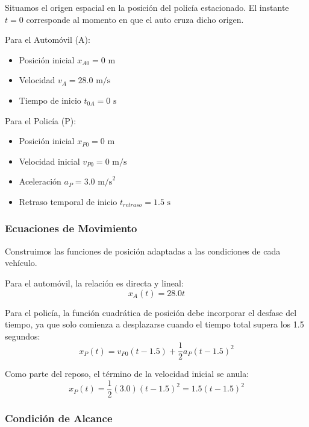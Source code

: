 \documentclass[12pt, a4paper]{article}
\begin{document}
Situamos el origen espacial en la posición del policía estacionado. El instante $t = 0$ corresponde al momento en que el auto cruza dicho origen.

Para el Automóvil (A):
\begin{itemize}
    \item Posición inicial $x_{A0} = 0 \text{ m}$
    \item Velocidad $v_A = 28.0 \text{ m/s}$
    \item Tiempo de inicio $t_{0A} = 0 \text{ s}$
\end{itemize}

Para el Policía (P):
\begin{itemize}
    \item Posición inicial $x_{P0} = 0 \text{ m}$
    \item Velocidad inicial $v_{P0} = 0 \text{ m/s}$
    \item Aceleración $a_P = 3.0 \text{ m/s}^2$
    \item Retraso temporal de inicio $t_{retraso} = 1.5 \text{ s}$
\end{itemize}

\subsubsection*{Ecuaciones de Movimiento}

Construimos las funciones de posición adaptadas a las condiciones de cada vehículo. 

Para el automóvil, la relación es directa y lineal:
\begin{equation}
x_A(t) = 28.0t
\end{equation}

Para el policía, la función cuadrática de posición debe incorporar el desfase del tiempo, ya que solo comienza a desplazarse cuando el tiempo total supera los 1.5 segundos:
\begin{equation}
x_P(t) = v_{P0}(t - 1.5) + \frac{1}{2} a_P (t - 1.5)^2
\end{equation}

Como parte del reposo, el término de la velocidad inicial se anula:
\begin{equation}
x_P(t) = \frac{1}{2} (3.0) (t - 1.5)^2 = 1.5(t - 1.5)^2
\end{equation}

\subsubsection*{Condición de Alcance}
\end{document}
